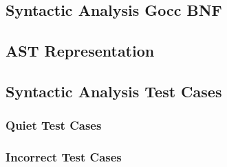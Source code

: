 \subsection{Syntactic Analysis Gocc BNF}
\label{app:parser/gocc}



\clearpage

\subsection{AST Representation}
\label{app:parser/ast_doc}



\clearpage

\subsection{Syntactic Analysis Test Cases}
\label{app:parser/testcases}

\subsubsection{Quiet Test Cases}
\label{app:parser/quiet}





\clearpage %

\subsubsection{Incorrect Test Cases}
\label{app:parser/incorrect}



